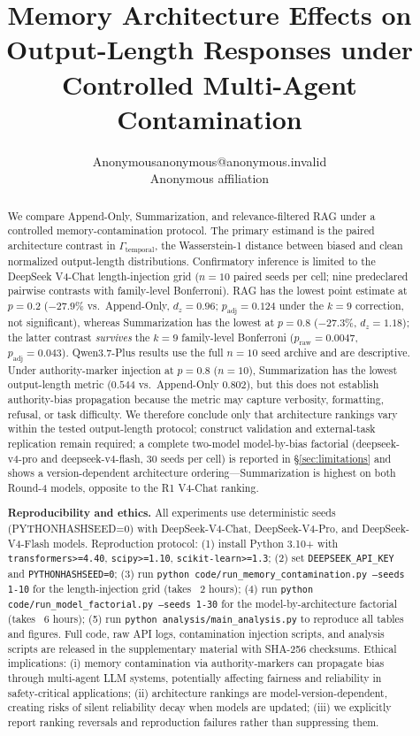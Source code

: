 \documentclass[11pt]{article}
\title{Memory Architecture Effects on Output-Length Responses under Controlled Multi-Agent Contamination}
\author{\name Anonymous\email anonymous@anonymous.invalid\\\addr Anonymous affiliation}
\date{}
\begin{document}
\maketitle

\begin{abstract}
We compare Append-Only, Summarization, and relevance-filtered RAG under a controlled memory-contamination protocol. The primary estimand is the paired architecture contrast in $\Gamma_{\text{temporal}}$, the Wasserstein-1 distance between biased and clean normalized output-length distributions. Confirmatory inference is limited to the DeepSeek V4-Chat length-injection grid ($n{=}10$ paired seeds per cell; nine predeclared pairwise contrasts with family-level Bonferroni). RAG has the lowest point estimate at $p{=}0.2$ ($-27.9\%$ vs.\ Append-Only, $d_z{=}0.96$; $p_{\text{adj}}{=}0.124$ under the $k{=}9$ correction, not significant), whereas Summarization has the lowest at $p{=}0.8$ ($-27.3\%$, $d_z{=}1.18$); the latter contrast \emph{survives} the $k{=}9$ family-level Bonferroni ($p_{\text{raw}}{=}0.0047$, $p_{\text{adj}}{=}0.043$). Qwen3.7-Plus results use the full $n{=}10$ seed archive and are descriptive. Under authority-marker injection at $p{=}0.8$ ($n{=}10$), Summarization has the lowest output-length metric ($0.544$ vs.\ Append-Only $0.802$), but this does not establish authority-bias propagation because the metric may capture verbosity, formatting, refusal, or task difficulty. We therefore conclude only that architecture rankings vary within the tested output-length protocol; construct validation and external-task replication remain required; a complete two-model model-by-bias factorial (deepseek-v4-pro and deepseek-v4-flash, 30 seeds per cell) is reported in \S\ref{sec:limitations} and shows a version-dependent architecture ordering---Summarization is highest on both Round-4 models, opposite to the R1 V4-Chat ranking.


\textbf{Reproducibility and ethics.} All experiments use deterministic seeds (PYTHONHASHSEED=0) with DeepSeek-V4-Chat, DeepSeek-V4-Pro, and DeepSeek-V4-Flash models. Reproduction protocol: (1) install Python 3.10+ with \texttt{transformers>=4.40}, \texttt{scipy>=1.10}, \texttt{scikit-learn>=1.3}; (2) set \texttt{DEEPSEEK\_API\_KEY} and \texttt{PYTHONHASHSEED=0}; (3) run \texttt{python code/run\_memory\_contamination.py --seeds 1-10} for the length-injection grid (takes ~2 hours); (4) run \texttt{python code/run\_model\_factorial.py --seeds 1-30} for the model-by-architecture factorial (takes ~6 hours); (5) run \texttt{python analysis/main\_analysis.py} to reproduce all tables and figures. Full code, raw API logs, contamination injection scripts, and analysis scripts are released in the supplementary material with SHA-256 checksums. Ethical implications: (i) memory contamination via authority-markers can propagate bias through multi-agent LLM systems, potentially affecting fairness and reliability in safety-critical applications; (ii) architecture rankings are model-version-dependent, creating risks of silent reliability decay when models are updated; (iii) we explicitly report ranking reversals and reproduction failures rather than suppressing them.\end{abstract}
\end{document}
